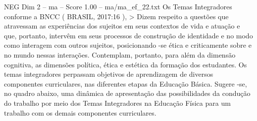 \begin{textsample}{NEG Dim 2 – ma – Score 1.00 – ma/ma\_ef\_22.txt}
Os Temas Integradores conforme a BNCC ( BRASIL, 2017:16 ), > Dizem respeito a questões que atravessam as experiências dos sujeitos em seus contextos de vida e atuação e que, portanto, intervêm em seus processos de construção de identidade e no modo como interagem com outros sujeitos, posicionando -se ética e criticamente sobre e no mundo nessas interações.
Contemplam, portanto, para além da dimensão cognitiva, as dimensões política, ética e estética da formação dos estudantes.
Os temas integradores perpassam objetivos de aprendizagem de diversos componentes curriculares, nas diferentes etapas da Educação Básica.
Sugere -se, no quadro abaixo, uma dinâmica de apresentação das possibilidades da condução do trabalho por meio dos Temas Integradores na Educação Física para um trabalho com os demais componentes curriculares.

\end{textsample}
